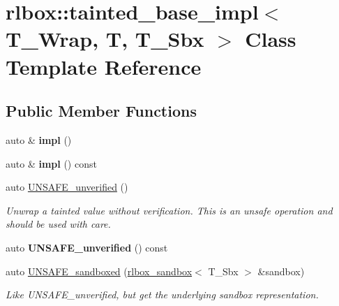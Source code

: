\hypertarget{classrlbox_1_1tainted__base__impl}{}\section{rlbox\+:\+:tainted\+\_\+base\+\_\+impl$<$ T\+\_\+\+Wrap, T, T\+\_\+\+Sbx $>$ Class Template Reference}
\label{classrlbox_1_1tainted__base__impl}
\subsection*{Public Member Functions}
\begin{DoxyCompactItemize}
\item 
\mbox{\label{classrlbox_1_1tainted__base__impl_a7c1c8a81e0c89fc20607c3021bf711dd}} 
auto \& {\bfseries impl} ()
\item 
\mbox{\label{classrlbox_1_1tainted__base__impl_aebf64332a129c6782da259efee237dff}} 
auto \& {\bfseries impl} () const
\item 
\mbox{\label{classrlbox_1_1tainted__base__impl_a01acab6b4bd8137afa03cf4b2678844f}} 
auto \hyperlink{classrlbox_1_1tainted__base__impl_a01acab6b4bd8137afa03cf4b2678844f}{U\+N\+S\+A\+F\+E\+\_\+unverified} ()
\begin{DoxyCompactList}\small\item\em Unwrap a tainted value without verification. This is an unsafe operation and should be used with care. \end{DoxyCompactList}\item 
\mbox{\label{classrlbox_1_1tainted__base__impl_a41f8eed43072bf173cce34cd3351191e}} 
auto {\bfseries U\+N\+S\+A\+F\+E\+\_\+unverified} () const
\item 
auto \hyperlink{classrlbox_1_1tainted__base__impl_ae2c69129cbb9344e7d2623129f031214}{U\+N\+S\+A\+F\+E\+\_\+sandboxed} (\hyperlink{classrlbox_1_1rlbox__sandbox}{rlbox\+\_\+sandbox}$<$ T\+\_\+\+Sbx $>$ \&sandbox)
\begin{DoxyCompactList}\small\item\em Like U\+N\+S\+A\+F\+E\+\_\+unverified, but get the underlying sandbox representation. \end{DoxyCompactList}\item 

\end{DoxyCompactItemize}
